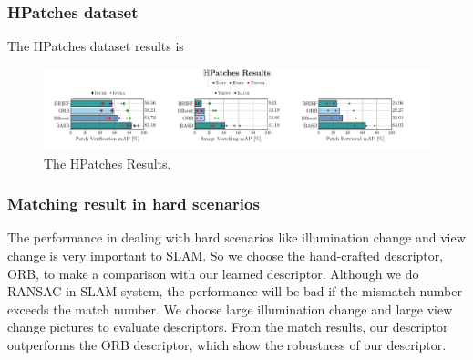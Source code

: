 \documentclass[letterpaper, 10 pt, conference]{ieeeconf}  %
\begin{document}
\subsubsection{HPatches dataset}
The HPatches dataset results is

\begin{figure}[h]
\centering
\includegraphics[scale=0.25]{HPatches--orb_brief_binboost_BASD}
\caption{The HPatches Results.} \scriptsize
\end{figure}


\subsubsection{Matching result in hard scenarios}
The performance in dealing with hard scenarios like illumination change and view change is very important to SLAM. So we choose the hand-crafted descriptor, ORB, to make a comparison with our learned descriptor. Although we do RANSAC in SLAM system, the performance will be bad if the mismatch number exceeds the match number. We choose large illumination change and large view change pictures to evaluate descriptors. From the match results, our descriptor outperforms the ORB descriptor, which show the robustness of our descriptor.

%
%

\end{document}
